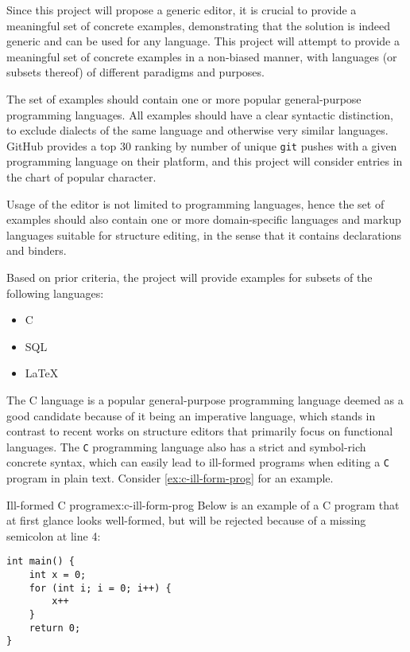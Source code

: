 Since this project will propose a generic editor, it is crucial to provide a meaningful set of concrete examples, demonstrating that the solution is indeed generic and can be used for any language.
This project will attempt to provide a meaningful set of concrete examples in a non-biased manner, with languages (or subsets thereof) of different paradigms and purposes.

The set of examples should contain one or more popular general-purpose programming languages.
All examples should have a clear syntactic distinction, to exclude dialects of the same language and otherwise very similar languages. \\ GitHub provides a top 30 ranking\cite{prog-lang-metrics} by number of unique \texttt{git} pushes with a given programming language on their platform, and this project will consider entries in the chart of popular character.

Usage of the editor is not limited to programming languages, hence the set of examples should also contain one or more domain-specific languages and markup languages suitable for structure editing, in the sense that it contains declarations and binders.

Based on prior criteria, the project will provide examples for subsets of the following languages:
\begin{itemize}
    \item C
    \item SQL
    \item \LaTeX
\end{itemize}

The C language\cite{c-iso-standard} is a popular general-purpose programming language deemed as a good candidate because of it being an imperative language, which stands in contrast to recent works on structure editors\cite{aalborg}\cite{godiksen}\cite{omar} that primarily focus on functional languages. The \texttt{C} programming language also has a strict and symbol-rich concrete syntax, which can easily lead to ill-formed programs when editing a \texttt{C} program in plain text. Consider \cref{ex:c-ill-form-prog} for an example.

\begin{myfigure}{Ill-formed C program}{ex:c-ill-form-prog}
    Below is an example of a C program that at first glance looks well-formed, but will be rejected because of a missing semicolon at line 4:
    \begin{lstlisting}
int main() {
    int x = 0;
    for (int i; i = 0; i++) {
        x++
    }
    return 0;
}
    \end{lstlisting}
\end{myfigure}

